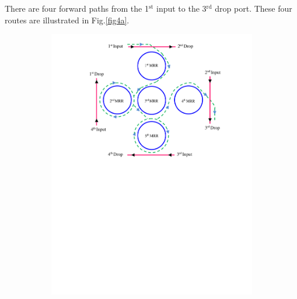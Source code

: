\documentclass{osa-article}
\begin{document}
There are four forward paths from the 1$^{\text{st}}$ input to the 3$^{\text{rd}}$ drop port.  These four routes are illustrated in Fig.\ref{fig4a}.
\begin{figure}[h!]
  \centering
  \begin{subfigure}[b]{0.4\linewidth}
    \includegraphics[width=\linewidth]{figs/fig4a_ID131.pdf}
    \caption{}
  \end{subfigure}
  \begin{subfigure}[b]{0.4\linewidth}

\end{subfigure}
\end{figure}
\end{document}
